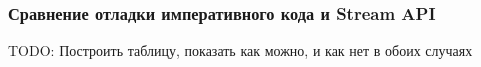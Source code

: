 \begin{frame}
\frametitle{Сравнение отладки императивного кода и Stream API} %
TODO: Построить таблицу, показать как можно, и как нет в обоих случаях
\end{frame}
